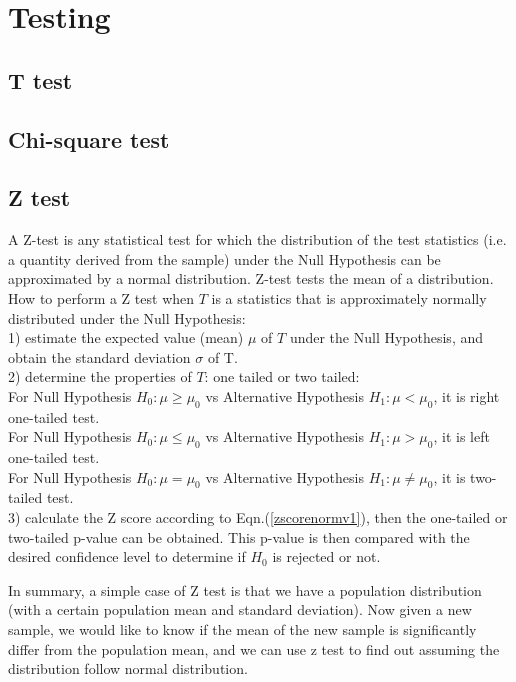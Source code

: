 \graphicspath{%
{chapter3graph/}%
{chapter3graph/bg/}}

\chapter{Testing}

\section{T test}

\section{Chi-square test}

\section{Z test}
\label{ztest}

A Z-test is any statistical test for which the distribution of the test statistics (i.e. a quantity derived from the sample) under the Null Hypothesis can be approximated by a normal distribution. Z-test tests the mean of a distribution. \\

How to perform a Z test when $T$ is a statistics that is approximately normally distributed under the Null Hypothesis:\\
1) estimate the expected value (mean) $\mu$ of $T$ under the Null Hypothesis, and obtain the standard deviation $\sigma$ of T.\\
2) determine the properties of $T$: one tailed or two tailed: \\
For Null Hypothesis $H_0: \mu \geq \mu_0$ vs Alternative Hypothesis $H_1: \mu < \mu_0$, it is right one-tailed test.\\ 
For Null Hypothesis $H_0: \mu \leq \mu_0$ vs Alternative Hypothesis $H_1: \mu > \mu_0$, it is left one-tailed test.\\ 
For Null Hypothesis $H_0: \mu = \mu_0$ vs Alternative Hypothesis $H_1: \mu \neq \mu_0$, it is two-tailed test.\\ 

3) calculate the Z score according to Eqn.(\ref{zscorenormv1}), then the one-tailed or two-tailed p-value can be obtained. This p-value is then compared with the desired confidence level to determine if $H_0$ is rejected or not.

In summary, a simple case of Z test is that we have a population distribution (with a certain population mean and standard deviation). Now given a new sample, we would like to know if the mean of the new sample is significantly differ from the population mean, and we can use z test to find out assuming the distribution follow normal distribution.\\

